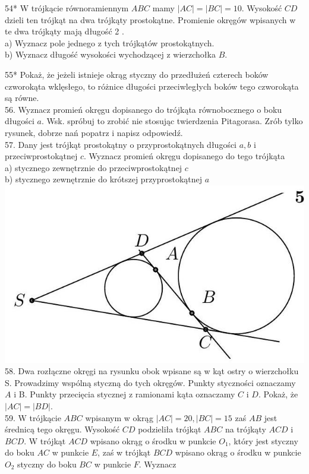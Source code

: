 \documentclass[10pt]{article}
\begin{document}
54* W trójkącie równoramiennym \(A B C\) mamy \(|A C|=|B C|=10\). Wysokość \(C D\) dzieli ten trójkąt na dwa trójkąty prostokątne. Promienie okręgów wpisanych w te dwa trójkąty mają długość 2 .\\
a) Wyznacz pole jednego z tych trójkątów prostokątnych.\\
b) Wyznacz długość wysokości wychodzącej z wierzchołka \(B\).

55* Pokaż, że jeżeli istnieje okrąg styczny do przedłużeń czterech boków czworokąta wklęsłego, to różnice długości przeciwległych boków tego czworokąta są równe.\\
56. Wyznacz promień okręgu dopisanego do trójkąta równobocznego o boku długości \(a\). Wsk. spróbuj to zrobić nie stosując twierdzenia Pitagorasa. Zrób tylko rysunek, dobrze nań popatrz i napisz odpowiedź.\\
57. Dany jest trójkąt prostokątny o przyprostokątnych długości \(a, b\) i przeciwprostokątnej \(c\). Wyznacz promień okręgu dopisanego do tego trójkąta\\
a) stycznego zewnętrznie do przeciwprostokątnej \(c\)\\
b) stycznego zewnętrznie do krótszej przyprostokątnej \(a\)\\
\includegraphics[max width=\textwidth, center]{2024_11_21_e9b4faa005d5be2cc318g-043}\\
58. Dwa rozłączne okręgi na rysunku obok wpisane są w kąt ostry o wierzchołku S. Prowadzimy wspólną styczną do tych okręgów. Punkty styczności oznaczamy \(A\) i B. Punkty przecięcia stycznej z ramionami kąta oznaczamy \(C\) i \(D\). Pokaż, że \(|A C|=|B D|\).\\
59. W trójkącie \(A B C\) wpisanym w okrąg \(|A C|=20,|B C|=15\) zaś \(A B\) jest średnicą tego okręgu. Wysokość \(C D\) podzieliła trójkąt \(A B C\) na trójkąty \(A C D\) i \(B C D\). W trójkąt \(A C D\) wpisano okrąg o środku w punkcie \(O_{1}\), który jest styczny do boku \(A C\) w punkcie \(E\), zaś w trójkąt \(B C D\) wpisano okrąg o środku w punkcie \(O_{2}\) styczny do boku \(B C\) w punkcie \(F\). Wyznacz\\
\end{document}

